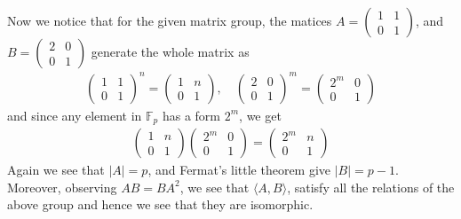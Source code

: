 \documentclass[12pt]{exam}
\theoremstyle{plain} %
\theoremstyle{definition} %
\theoremstyle{remark} %
\begin{document}
\begin{questions}
\begin{solution}
      Now we notice that for the given matrix group, the matices $ A =
      \begin{pmatrix}%
        1 & 1 \\
        0 & 1
      \end{pmatrix}$, and $ B=
      \begin{pmatrix}%
        2 & 0\\
        0 & 1
      \end{pmatrix}$
      generate the whole matrix as
      \begin{align*}
        \begin{pmatrix}%
          1 & 1\\
          0 & 1
        \end{pmatrix}^n =
        \begin{pmatrix}%
          1 & n\\
          0 & 1
        \end{pmatrix},  \quad
        \begin{pmatrix}%
          2 & 0\\
          0 & 1
        \end{pmatrix}^m =
        \begin{pmatrix}%
          2^m & 0\\
          0 & 1
        \end{pmatrix}
      \end{align*}
      and since any element in $\mathbb{F}_p$ has a form $2^m$, we get
      \begin{align*}
        \begin{pmatrix}%
          1 & n\\
          0 & 1
        \end{pmatrix}
        \begin{pmatrix}%
          2^m & 0\\
          0 & 1
        \end{pmatrix} =
        \begin{pmatrix}%
          2^m & n \\
          0 & 1
        \end{pmatrix}
      \end{align*}
      Again we see that $|A| = p$, and Fermat's little theorem give
      $|B| = p-1$. Moreover, observing $AB = BA^2$, we see that
      $\langle  A, B \rangle $, satisfy all the relations of the
      above group and hence we see that they are isomorphic.
    \end{solution}


\end{questions}
\end{document}

